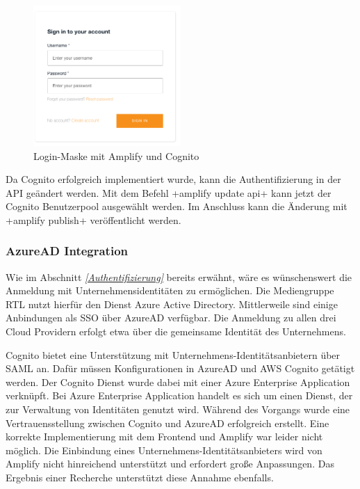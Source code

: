 \begin{figure}[htbp]
    \centering
    \includegraphics[width=0.5\textwidth]{50-Implementierung/Login.png}
    \caption{Login-Maske mit Amplify und Cognito}
    \label{fig:meine-grafik}
\end{figure}


Da Cognito erfolgreich implementiert wurde, kann die Authentifizierung in der API geändert werden.
Mit dem Befehl \spverb+amplify update api+ kann jetzt der Cognito Benutzerpool ausgewählt werden.
Im Anschluss kann die Änderung mit \spverb+amplify publish+ veröffentlicht werden.

\clearpage
\subsubsection{AzureAD Integration}

Wie im Abschnitt \textit{\ref{Authentifizierung} } bereits erwähnt, wäre es wünschenswert die Anmeldung mit Unternehmensidentitäten zu ermöglichen.
Die Mediengruppe RTL nutzt hierfür den Dienst Azure Active Directory.
Mittlerweile sind einige Anbindungen als SSO über AzureAD verfügbar.
Die Anmeldung zu allen drei Cloud Providern erfolgt etwa über die gemeinsame Identität des Unternehmens.

Cognito bietet eine Unterstützung mit Unternehmens-Identitätsanbietern über SAML an.
Dafür müssen Konfigurationen in AzureAD und AWS Cognito getätigt werden.
Der Cognito Dienst wurde dabei mit einer \glqq Azure Enterprise Application\grqq{} verknüpft.
Bei \glqq Azure Enterprise Application\grqq{} handelt es sich um einen Dienst, der zur Verwaltung von Identitäten genutzt wird.
Während des Vorgangs wurde eine Vertrauensstellung zwischen Cognito und AzureAD erfolgreich erstellt.
Eine korrekte Implementierung mit dem Frontend und Amplify war leider nicht möglich.
Die Einbindung eines Unternehmens-Identitätsanbieters wird von Amplify nicht hinreichend unterstützt und erfordert große Anpassungen.
Das Ergebnis einer Recherche unterstützt diese Annahme ebenfalls.

